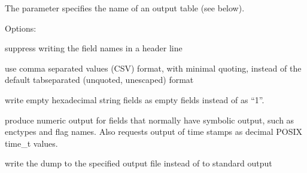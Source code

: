 \documentclass[letterpaper,10pt,english]{sphinxmanual}
\begin{document}
\sphinxAtStartPar
The  parameter specifies the name of an output table (see
below).

\sphinxAtStartPar
Options:
\begin{description}
\sphinxAtStartPar
suppress writing the field names in a header line

\sphinxAtStartPar
use comma separated values (CSV) format, with minimal quoting,
instead of the default tab\sphinxhyphen{}separated (unquoted, unescaped) format

\sphinxAtStartPar
write empty hexadecimal string fields as empty fields instead of
as “\sphinxhyphen{}1”.

\sphinxAtStartPar
produce numeric output for fields that normally have symbolic
output, such as enctypes and flag names.  Also requests output of
time stamps as decimal POSIX time\_t values.

\sphinxAtStartPar
write the dump to the specified output file instead of to standard
output

\end{description}
\end{document}
